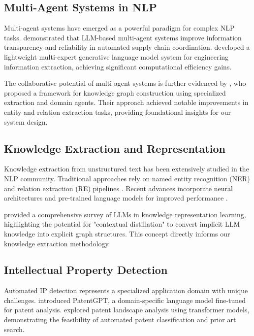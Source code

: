 \documentclass[11pt,a4paper]{article}
\begin{document}
\subsection{Multi-Agent Systems in NLP}

Multi-agent systems have emerged as a powerful paradigm for complex NLP tasks. \citet{zhao2025multia} demonstrated that LLM-based multi-agent systems improve information transparency and reliability in automated supply chain coordination. \citet{bogachov2025lightweight} developed a lightweight multi-expert generative language model system for engineering information extraction, achieving significant computational efficiency gains.

The collaborative potential of multi-agent systems is further evidenced by \citet{zhang2024multiagent}, who proposed a framework for knowledge graph construction using specialized extraction and domain agents. Their approach achieved notable improvements in entity and relation extraction tasks, providing foundational insights for our system design.

\subsection{Knowledge Extraction and Representation}

Knowledge extraction from unstructured text has been extensively studied in the NLP community. Traditional approaches rely on named entity recognition (NER) and relation extraction (RE) pipelines \citep{li2022survey}. Recent advances incorporate neural architectures and pre-trained language models for improved performance \citep{wang2024large}.

\citet{wang2024survey} provided a comprehensive survey of LLMs in knowledge representation learning, highlighting the potential for "contextual distillation" to convert implicit LLM knowledge into explicit graph structures. This concept directly informs our knowledge extraction methodology.

\subsection{Intellectual Property Detection}

Automated IP detection represents a specialized application domain with unique challenges. \citet{bai2024patentgpt} introduced PatentGPT, a domain-specific language model fine-tuned for patent analysis. \citet{aristodemou2024patent} explored patent landscape analysis using transformer models, demonstrating the feasibility of automated patent classification and prior art search.
\end{document}
